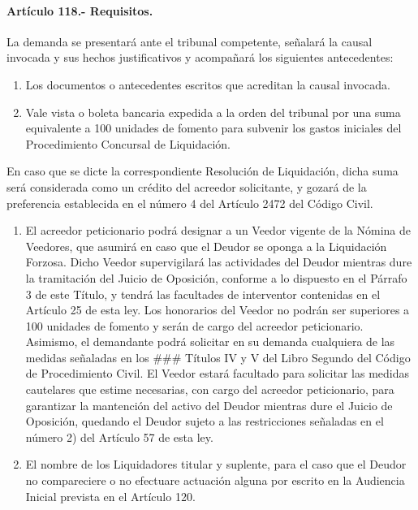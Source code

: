 \documentclass[
]{book}
\begin{document}
\hypertarget{artuxedculo-118.--requisitos.}{%
\paragraph*{Artículo 118.- Requisitos.}\label{artuxedculo-118.--requisitos.}}

La demanda se presentará ante el tribunal competente, señalará la causal invocada y sus hechos justificativos y acompañará los siguientes antecedentes:

\begin{enumerate}
\def\labelenumi{\arabic{enumi})}
\item
  Los documentos o antecedentes escritos que acreditan la causal invocada.
\item
  Vale vista o boleta bancaria expedida a la orden del tribunal por una suma equivalente a 100 unidades de fomento para subvenir los gastos iniciales del Procedimiento Concursal de Liquidación.
\end{enumerate}

En caso que se dicte la correspondiente Resolución de Liquidación, dicha suma será considerada como un crédito del acreedor solicitante, y gozará de la preferencia establecida en el número 4 del Artículo 2472 del Código Civil.

\begin{enumerate}
\def\labelenumi{\arabic{enumi})}
\setcounter{enumi}{2}
\item
  El acreedor peticionario podrá designar a un Veedor vigente de la Nómina de Veedores, que asumirá en caso que el Deudor se oponga a la Liquidación Forzosa. Dicho Veedor supervigilará las actividades del Deudor mientras dure la tramitación del Juicio de Oposición, conforme a lo dispuesto en el Párrafo 3 de este Título, y tendrá las facultades de interventor contenidas en el Artículo 25 de esta ley. Los honorarios del Veedor no podrán ser superiores a 100 unidades de fomento y serán de cargo del acreedor peticionario. Asimismo, el demandante podrá solicitar en su demanda cualquiera de las medidas señaladas en los \#\#\# Títulos IV y V del Libro Segundo del Código de Procedimiento Civil. El Veedor estará facultado para solicitar las medidas cautelares que estime necesarias, con cargo del acreedor peticionario, para garantizar la mantención del activo del Deudor mientras dure el Juicio de Oposición, quedando el Deudor sujeto a las restricciones señaladas en el número 2) del Artículo 57 de esta ley.
\item
  El nombre de los Liquidadores titular y suplente, para el caso que el Deudor no compareciere o no efectuare actuación alguna por escrito en la Audiencia Inicial prevista en el Artículo 120.
\end{enumerate}
\end{document}

